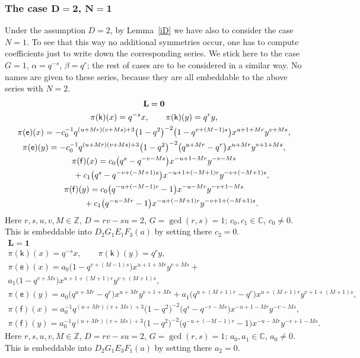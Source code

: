 \documentclass[pdftex]{sigma}
\numberwithin{equation}{section}
\begin{document}
\subsubsection*{The case $\boldsymbol{D=2}$, $\boldsymbol{N=1}$}

Under the assumption $D=2$, by Lemma~\ref{iD} we have also to consider the case $N=1$. To see that this way no additional symmetries occur, one has to compute coefficients just to write down the corresponding series. We stick here to the case $G=1$, $\alpha=q^{-s}$, $\beta=q^r$; the rest of cases are to be considered in a similar way. No names are given to these series, because they are all embeddable to the above series with $N=2$.
\begin{gather*}
 \mathbf{L}=\mathbf{0}\\
\pi(\mathsf{k})(x)= q^{-s}x ,\qquad\pi(\mathsf{k})(y)=q^ry ,\\
\pi(\mathsf{e})(x)= -c_0^{-1}q^{(u+Mr)(v+Ms)+3}\big(1-q^2\big)^{-2}\big(1-q^{v+(M-1)s}\big)x^{u+1+Mr}y^{v+Ms} ,\\
\pi(\mathsf{e})(y)= -c_0^{-1}q^{(u+Mr)(v+Ms)+3}\big(1-q^2\big)^{-2}\big(q^{u+Mr}-q^r\big)x^{u+Mr}y^{v+1+Ms} ,\\
\pi(\mathsf{f})(x)= c_0\big(q^s-q^{-v-Ms}\big)x^{-u+1-Mr}y^{-v-Ms}\\
\hphantom{\pi(\mathsf{f})(x)=}{} + c_1\big(q^s-q^{-v+(-M+1)s}\big) x^{-u+1+(-M+1)r}y^{-v+(-M+1)s} ,\\
 \pi(\mathsf{f})(y)= c_0\big(q^{-u+(-M-1)r}-1\big)x^{-u-Mr}y^{-v+1-Ms}\\
 \hphantom{\pi(\mathsf{f})(y)=}{} + c_1\big(q^{-u-Mr}-1\big)x^{-u+(-M+1)r}y^{-v+1+(-M+1)s} .
\end{gather*}
Here $r,s,u,v,M\in\mathbb{Z}$, $D=rv-su=2$, $G=\operatorname{gcd}(r,s)=1$; $c_0,c_1\in\mathbb{C}$, $c_0\ne 0$. This is embeddable into $D_2G_1E_1F_3(a)$ by setting there $c_2=0$.
\begin{gather*}
 \mathbf{L}=\mathbf{1}\\
 \pi(\mathsf{k})(x)= q^{-s}x ,\qquad\pi(\mathsf{k})(y)=q^ry ,\\
\pi(\mathsf{e})(x)= a_0\big(1-q^{v+(M-1)s}\big)x^{u+1+Mr}y^{v+Ms}+\\ a_1\big(1-q^{v+Ms}\big)x^{u+1+(M+1)r}y^{v+(M+1)s} ,\\
\pi(\mathsf{e})(y)= a_0\big(q^{u+Mr}-q^r\big)x^{u+Mr}y^{v+1+Ms}+ a_1\big(q^{u+(M+1)r}-q^r\big)x^{u+(M+1)r}y^{v+1+(M+1)s} ,\\
\pi(\mathsf{f})(x)= a_0^{-1}q^{(u+Mr)(v+Ms)+3}\big(1-q^2\big)^{-2}\big(q^s-q^{-v-Ms}\big)x^{-u+1-Mr}y^{-v-Ms} ,\\
\pi(\mathsf{f})(y)= a_0^{-1}q^{(u+Mr)(v+Ms)+3}\big(1-q^2\big)^{-2}\big(q^{-u+(-M-1)r}-1\big)x^{-u-Mr}y^{-v+1-Ms} .
\end{gather*}
Here $r,s,u,v,M\in\mathbb{Z}$, $D=rv-su=2$, $G=\operatorname{gcd}(r,s)=1$; $a_0,a_1\in\mathbb{C}$, $a_0\ne 0$. This is embeddable into $D_2G_1E_3F_1(a)$ by setting there $a_2=0$.
\end{document}
